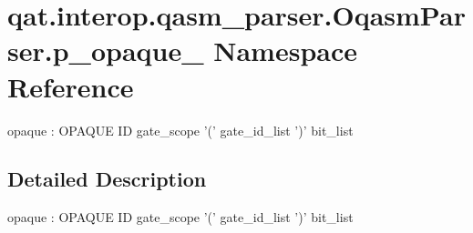 \hypertarget{namespaceqat_1_1interop_1_1qasm__parser_1_1OqasmParser_1_1p__opaque__2}{\section{qat.\-interop.\-qasm\-\_\-parser.\-Oqasm\-Parser.\-p\-\_\-opaque\-\_ Namespace Reference}
\label{namespaceqat_1_1interop_1_1qasm__parser_1_1OqasmParser_1_1p__opaque__2}
}


opaque \-: O\-P\-A\-Q\-U\-E I\-D gate\-\_\-scope '(' gate\-\_\-id\-\_\-list ')' bit\-\_\-list  




\subsection{Detailed Description}
opaque \-: O\-P\-A\-Q\-U\-E I\-D gate\-\_\-scope '(' gate\-\_\-id\-\_\-list ')' bit\-\_\-list 